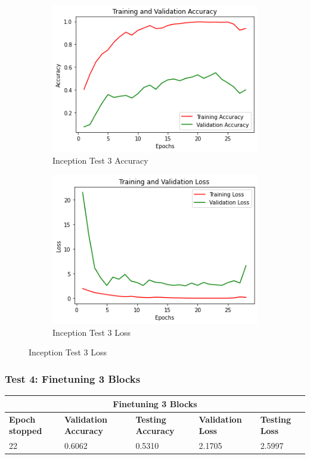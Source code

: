\begin{figure}[H]
	\begin{subfigure}{0.5\textwidth}
		\includegraphics[width=0.9\linewidth]{img/inception/inceptionft2acc.png} 
		\caption{Inception Test 3 Accuracy}
		\label{fig:inceptionft2acc}
	\end{subfigure}
	\begin{subfigure}{0.5\textwidth}
		\includegraphics[width=0.9\linewidth]{img/inception/inceptionft2loss.png}
		\caption{Inception Test 3 Loss}
		\label{fig:inceptionft2loss}
	\end{subfigure}
\end{figure}


\subsubsection{Test 4: Finetuning 3 Blocks}
\begin{tabular}{ |p{2cm}|p{2cm}|p{2cm}|p{2cm}|p{2cm}|  }
\hline
\multicolumn{5}{|c|}{Finetuning 3 Blocks} \\
\hline
\textbf{Epoch stopped} & \textbf{Validation Accuracy} & \textbf{Testing Accuracy} & \textbf{Validation Loss} & \textbf{Testing Loss} \\
\hline
22 & 0.6062 & 0.5310 & 2.1705 & 2.5997\\
\hline
\end{tabular}

